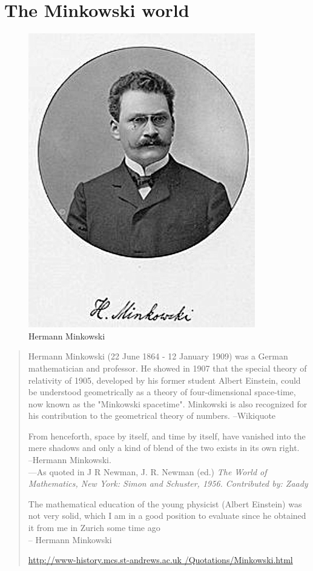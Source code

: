 \chapter{The Minkowski world}

\newpage
\thispagestyle{empty}
\begin{figure}[H]
\centering
\includegraphics[scale=.5]{src/images/lbk-graphics/portraits/minkowski-wiki.jpg}
\caption*{Hermann Minkowski}
\end{figure}
\begin{quote}
Hermann Minkowski (22 June 1864 - 12 January 1909) was a 
German mathematician and professor. He show\-ed in 1907 that 
the special theory of relativity of 1905, developed by his 
former student Albert Einstein, could be understood 
geometrically as a theory of four-dimen\-sional space-time, 
now known as the "Minkowski spacetime". Minkowski is also 
recognized for his contribution to the geometrical theory of 
numbers.
\hfill --Wikiquote
\newpage

From henceforth, space by itself, and time by itself, have 
vanished into the mere shadows and only a kind of blend of 
the two exists in its own right.\\\dm\hfill--Hermann 
Minkowski.\\---As quoted in J R Newman, J. R. Newman (ed.) 
\textsl{The World of Mathematics, New York: Simon and 
Schuster, 1956. Contributed by: Zaady}
\dm \vspace*{1\bsk}

The mathematical education of the young physicist (Albert 
Einstein) was not very solid, which I am in a good position 
to evaluate since he obtained it from me in Zurich some time 
ago \\ \dm \hfill-- Hermann Minkowski

\url{http://www-history.mcs.st-andrews.ac.uk
 /Quotations/Minkowski.html}
\end{quote}

